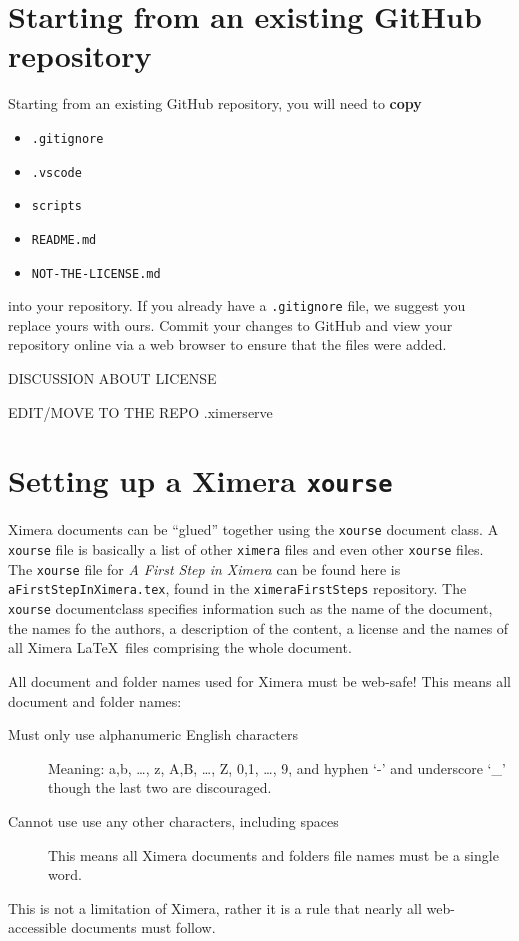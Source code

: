 \documentclass{ximera}
\begin{document}
\section{Starting from an existing GitHub repository}

Starting from an existing GitHub repository, you will need to \textbf{copy}
\begin{itemize}
  \item \texttt{.gitignore}
  \item \texttt{.vscode}
  \item \texttt{scripts}
  \item \texttt{README.md}
  \item \texttt{NOT-THE-LICENSE.md}
\end{itemize}
into your repository. If you already have a \verb|.gitignore| file, we suggest
you replace yours with ours. Commit your changes to GitHub and view your
repository online via a web browser to ensure that the files were added.

DISCUSSION ABOUT LICENSE

EDIT/MOVE TO THE REPO .ximerserve

\section{Setting up a Ximera \texttt{xourse}}

Ximera documents can be ``glued'' together using the \texttt{xourse} document
class.
A \verb|xourse| file is basically a list of other \verb|ximera| files and even
other \verb|xourse| files.
The \verb|xourse| file for \textit{A First Step in Ximera} can be found here is
\verb!aFirstStepInXimera.tex!, found in the \verb!ximeraFirstSteps! repository.
The \verb!xourse! documentclass specifies information such as the name of the
document, the names fo the authors, a description of the content, a license and
the names of all Ximera \LaTeX\ files comprising
the whole document.

\begin{warning}
  All document and folder names used for Ximera must be web-safe! This means
  all document and folder names:
  \begin{description}
    \item[Must only use alphanumeric English characters] Meaning: a,b, \dots,
      z, A,B, \dots, Z, 0,1, \dots, 9, and hyphen `-' and underscore `\_'
      though the
      last two are discouraged.
    \item[Cannot use use any other characters, including spaces] This means all
      Ximera documents and folders file names must be a single word.
  \end{description}
  This is not a limitation of Ximera, rather it is a rule that nearly all
  web-accessible documents must follow.
\end{warning}
\end{document}
